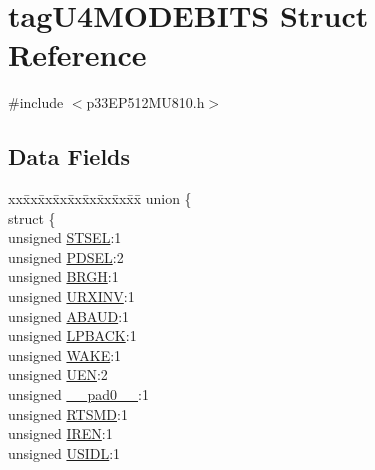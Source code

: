 \hypertarget{structtag_u4_m_o_d_e_b_i_t_s}{}\section{tag\+U4\+M\+O\+D\+E\+B\+I\+TS Struct Reference}
\label{structtag_u4_m_o_d_e_b_i_t_s}


{\ttfamily \#include $<$p33\+E\+P512\+M\+U810.\+h$>$}

\subsection*{Data Fields}
\begin{DoxyCompactItemize}
\item 
\begin{tabbing}
xx\=xx\=xx\=xx\=xx\=xx\=xx\=xx\=xx\=\kill
union \{\\
\>struct \{\\
\>\>unsigned \hyperlink{structtag_u4_m_o_d_e_b_i_t_s_a3d57376019f3ed30d788c5ad72938796}{STSEL}:1\\
\>\>unsigned \hyperlink{structtag_u4_m_o_d_e_b_i_t_s_acc0b2e4d43c615d3c033391b5c4a2d1b}{PDSEL}:2\\
\>\>unsigned \hyperlink{structtag_u4_m_o_d_e_b_i_t_s_a5ac4f749c73f2dfc0f8699b73fe251fc}{BRGH}:1\\
\>\>unsigned \hyperlink{structtag_u4_m_o_d_e_b_i_t_s_ab6387939f9a8bc487f0eab6e20afd53d}{URXINV}:1\\
\>\>unsigned \hyperlink{structtag_u4_m_o_d_e_b_i_t_s_aeb177356d5f30b6f3a28d8d65c4950f5}{ABAUD}:1\\
\>\>unsigned \hyperlink{structtag_u4_m_o_d_e_b_i_t_s_a138f7c04973519ef4dfe9bbc1610cbc0}{LPBACK}:1\\
\>\>unsigned \hyperlink{structtag_u4_m_o_d_e_b_i_t_s_a364c8b1b2c2f66b23dd1093ced3e20dd}{WAKE}:1\\
\>\>unsigned \hyperlink{structtag_u4_m_o_d_e_b_i_t_s_a2c884c6d86506e0a73df50998a97c1f9}{UEN}:2\\
\>\>unsigned \hyperlink{structtag_u4_m_o_d_e_b_i_t_s_adf71f3d8410c1f1dbbc96680a92c49af}{\_\_pad0\_\_}:1\\
\>\>unsigned \hyperlink{structtag_u4_m_o_d_e_b_i_t_s_a76bdbed23aeadbbf3d0d078bc48cc19f}{RTSMD}:1\\
\>\>unsigned \hyperlink{structtag_u4_m_o_d_e_b_i_t_s_a7e60ff69eada9f471fa59afdbaf29e93}{IREN}:1\\
\>\>unsigned \hyperlink{structtag_u4_m_o_d_e_b_i_t_s_a94d25c6c9271a4ab4f450319e34e2a00}{USIDL}:1\\

\end{tabbing}
\end{DoxyCompactItemize}

